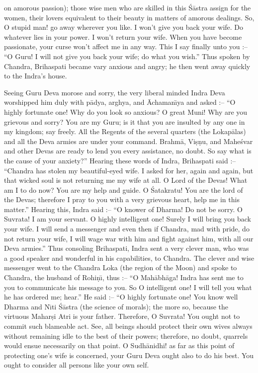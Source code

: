 on amorous passion); those wise men who are skilled in this \'S\=astra assign for the women, their lovers equivalent to their beauty in matters of amorous dealings. So, O stupid man! go away wherever you like. I won't give you back your wife. Do whatever lies in your power. I won't return your wife. When you have become passionate, your curse won't affect me in any way. This I say finally unto you :-- ``O Guru! I will not give you back your wife; do what you wish.'' Thus spoken by Chandra, Brihaspati became vary anxious and angry; he then went away quickly to the Indra's house.

Seeing Guru Deva morose and sorry, the very liberal minded Indra Deva worshipped him duly with p\=adya, arghya, and \=Achaman\={\i}ya and asked :-- ``O highly fortunate one! Why do you look so anxious? O great Muni! Why are you grievous and sorry? You are my Guru; is it that you are insulted by any one in my kingdom; say freely. All the Regents of the several quarters (the Lokap\=alas) and all the Deva armies are under your command. Brahm\=a, Vi\d{s}\d{n}u, and Mahe\'svar and other Devas are ready to lend you every assistance, no doubt. So say what is the cause of your anxiety?'' Hearing these words of Indra, Brihaspati said :-- ``Chandra has stolen my beautiful-eyed wife. I asked for her, again and again, but that wicked soul is not returning me my wife at all. O Lord of the Devas! What am I to do now? You are my help and guide. O \'Satakratu! You are the lord of the Devas; therefore I pray to you with a very grievous heart, help me in this matter.'' Hearing this, Indra said :-- ``O knower of Dharma! Do not be sorry. O Suvrata! I am your servant. O highly intelligent one! Surely I will bring you back your wife. I will send a messenger and even then if Chandra, mad with pride, do not return your wife, I will wage war with him and fight against him, with all our Deva armies.'' Thus consoling Brihaspati, Indra sent a very clever man, who was a good speaker and wonderful in his capabilities, to Chandra. The clever and wise messenger went to the Chandra Loka (the region of the Moon) and spoke to Chandra, the husband of Rohi\d{n}\={\i}, thus :-- ``O Mah\=abh\=aga! Indra has sent me to you to communicate his message to you. So O intelligent one! I will tell you what he has ordered me; hear.'' He said :-- ``O highly fortunate one! You know well Dharma and N\={\i}ti \'S\=astra (the science of morals); the more so, because the virtuous Mahar\d{s}i Atri is your father. Therefore, O Suvrata! You ought not to commit such blameable act. See, all beings should protect their own wives always without remaining idle to the best of their powers; therefore, no doubt, quarrels would ensue necessarily on that point. O Sudh\=anidhi! as far as this point of protecting one's wife is concerned, your Guru Deva ought also to do his best. You ought to consider all persons like your own self.


